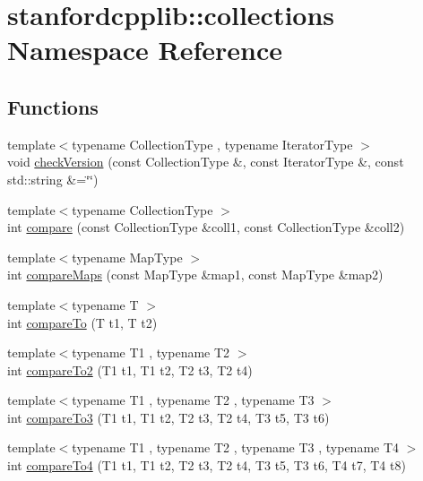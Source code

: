 \hypertarget{namespacestanfordcpplib_1_1collections}{}\section{stanfordcpplib\+:\+:collections Namespace Reference}
\label{namespacestanfordcpplib_1_1collections}
\subsection*{Functions}
\begin{DoxyCompactItemize}
\item 
{\footnotesize template$<$typename Collection\+Type , typename Iterator\+Type $>$ }\\void \mbox{\hyperlink{namespacestanfordcpplib_1_1collections_a91290b45c9efbe37b0c013fddfc8e4c4}{check\+Version}} (const Collection\+Type \&, const Iterator\+Type \&, const std\+::string \&=\char`\"{}\char`\"{})
\item 
{\footnotesize template$<$typename Collection\+Type $>$ }\\int \mbox{\hyperlink{namespacestanfordcpplib_1_1collections_a6d113dfaa3d28a3894990c64411ff03c}{compare}} (const Collection\+Type \&coll1, const Collection\+Type \&coll2)
\item 
{\footnotesize template$<$typename Map\+Type $>$ }\\int \mbox{\hyperlink{namespacestanfordcpplib_1_1collections_a1ed84a88db8dc524f50a355ef92bd7fb}{compare\+Maps}} (const Map\+Type \&map1, const Map\+Type \&map2)
\item 
{\footnotesize template$<$typename T $>$ }\\int \mbox{\hyperlink{namespacestanfordcpplib_1_1collections_a95fe9aa150f4b638394d31c4cf38360b}{compare\+To}} (T t1, T t2)
\item 
{\footnotesize template$<$typename T1 , typename T2 $>$ }\\int \mbox{\hyperlink{namespacestanfordcpplib_1_1collections_a69f00286f1ec18906424498a9a5f6bcc}{compare\+To2}} (T1 t1, T1 t2, T2 t3, T2 t4)
\item 
{\footnotesize template$<$typename T1 , typename T2 , typename T3 $>$ }\\int \mbox{\hyperlink{namespacestanfordcpplib_1_1collections_a654565af1c2d8e1b559f4606b0c9477e}{compare\+To3}} (T1 t1, T1 t2, T2 t3, T2 t4, T3 t5, T3 t6)
\item 
{\footnotesize template$<$typename T1 , typename T2 , typename T3 , typename T4 $>$ }\\int \mbox{\hyperlink{namespacestanfordcpplib_1_1collections_a0bf3548b5f27ad723062d6935604a849}{compare\+To4}} (T1 t1, T1 t2, T2 t3, T2 t4, T3 t5, T3 t6, T4 t7, T4 t8)

\end{DoxyCompactItemize}
